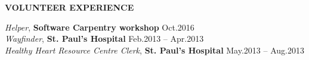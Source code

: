 \documentclass{res}
\renewcommand{\section}[1]{%
  \vspace{0.3in}%
  \centerline{\uppercase{\bf{#1}}}%
  \vspace{-6pt}}
\newcommand{\linehead}[2]{%
  {\bf #1} \hfill #2\\}
\newcommand{\linetitle}[1]{%
  {\sl #1}}
\newcommand{\linevolunteer}[3]{%
  {\sl #3}, {\bf #2} \hfill #1\\[.5ex]}
\begin{document}
\begin{resume}


\section{Volunteer experience}

\linevolunteer{Oct.2016}{%
  Software Carpentry workshop}{%
  Helper}
\linevolunteer{Feb.2013 -- Apr.2013}{%
  St. Paul's Hospital}{%
  Wayfinder}
\linevolunteer{May.2013 -- Aug.2013}{%
  St. Paul's Hospital}{%
  Healthy Heart Resource Centre Clerk}


\end{resume}
\end{document}
